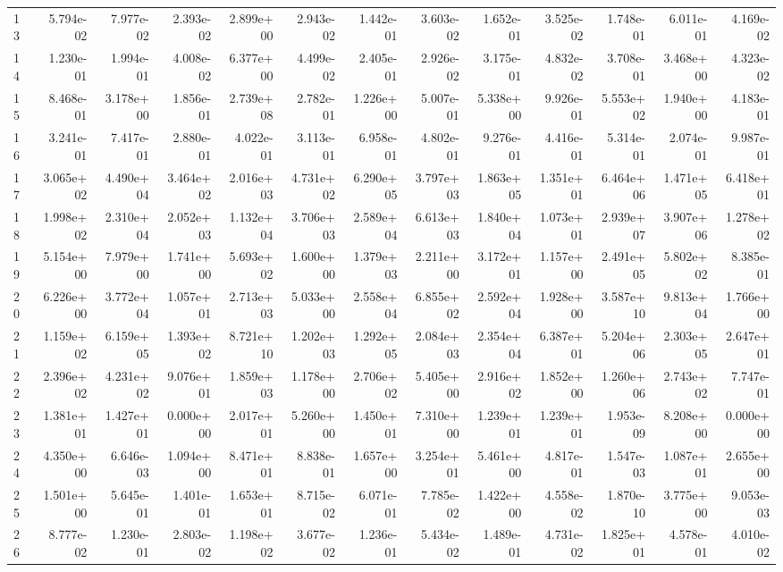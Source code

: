\begin{table}
\begin{tabular}{lrrrrrrrrrrrr}
13 & 5.794e-02 & 7.977e-02 & 2.393e-02 & 2.899e+00 & 2.943e-02 & 1.442e-01 & 3.603e-02 & 1.652e-01 & 3.525e-02 & 1.748e-01 & 6.011e-01 & 4.169e-02 \\
14 & 1.230e-01 & 1.994e-01 & 4.008e-02 & 6.377e+00 & 4.499e-02 & 2.405e-01 & 2.926e-02 & 3.175e-01 & 4.832e-02 & 3.708e-01 & 3.468e+00 & 4.323e-02 \\
15 & 8.468e-01 & 3.178e+00 & 1.856e-01 & 2.739e+08 & 2.782e-01 & 1.226e+00 & 5.007e-01 & 5.338e+00 & 9.926e-01 & 5.553e+02 & 1.940e+00 & 4.183e-01 \\
16 & 3.241e-01 & 7.417e-01 & 2.880e-01 & 4.022e-01 & 3.113e-01 & 6.958e-01 & 4.802e-01 & 9.276e-01 & 4.416e-01 & 5.314e-01 & 2.074e-01 & 9.987e-01 \\
17 & 3.065e+02 & 4.490e+04 & 3.464e+02 & 2.016e+03 & 4.731e+02 & 6.290e+05 & 3.797e+03 & 1.863e+05 & 1.351e+01 & 6.464e+06 & 1.471e+05 & 6.418e+01 \\
18 & 1.998e+02 & 2.310e+04 & 2.052e+03 & 1.132e+04 & 3.706e+03 & 2.589e+04 & 6.613e+03 & 1.840e+04 & 1.073e+01 & 2.939e+07 & 3.907e+06 & 1.278e+02 \\
19 & 5.154e+00 & 7.979e+00 & 1.741e+00 & 5.693e+02 & 1.600e+00 & 1.379e+03 & 2.211e+00 & 3.172e+01 & 1.157e+00 & 2.491e+05 & 5.802e+02 & 8.385e-01 \\
20 & 6.226e+00 & 3.772e+04 & 1.057e+01 & 2.713e+03 & 5.033e+00 & 2.558e+04 & 6.855e+02 & 2.592e+04 & 1.928e+00 & 3.587e+10 & 9.813e+04 & 1.766e+00 \\
21 & 1.159e+02 & 6.159e+05 & 1.393e+02 & 8.721e+10 & 1.202e+03 & 1.292e+05 & 2.084e+03 & 2.354e+04 & 6.387e+01 & 5.204e+06 & 2.303e+05 & 2.647e+01 \\
22 & 2.396e+02 & 4.231e+02 & 9.076e+01 & 1.859e+03 & 1.178e+00 & 2.706e+02 & 5.405e+00 & 2.916e+02 & 1.852e+00 & 1.260e+06 & 2.743e+02 & 7.747e-01 \\
23 & 1.381e+01 & 1.427e+01 & 0.000e+00 & 2.017e+01 & 5.260e+00 & 1.450e+01 & 7.310e+00 & 1.239e+01 & 1.239e+01 & 1.953e-09 & 8.208e+00 & 0.000e+00 \\
24 & 4.350e+00 & 6.646e-03 & 1.094e+00 & 8.471e+01 & 8.838e-01 & 1.657e+00 & 3.254e+01 & 5.461e+00 & 4.817e-01 & 1.547e-03 & 1.087e+01 & 2.655e+00 \\
25 & 1.501e+00 & 5.645e-01 & 1.401e-01 & 1.653e+01 & 8.715e-02 & 6.071e-01 & 7.785e-02 & 1.422e+00 & 4.558e-02 & 1.870e-10 & 3.775e+00 & 9.053e-03 \\
26 & 8.777e-02 & 1.230e-01 & 2.803e-02 & 1.198e+02 & 3.677e-02 & 1.236e-01 & 5.434e-02 & 1.489e-01 & 4.731e-02 & 1.825e+01 & 4.578e-01 & 4.010e-02 \\

\end{tabular}
\end{table}
